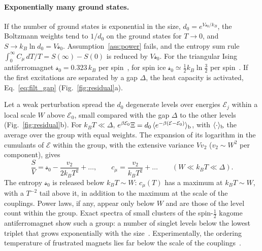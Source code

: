 \documentclass[10pt,a4paper]{article}
\theoremstyle{plain}
\newcommand{\enrg}{\mathcal{E}}  %
\newcommand{\lds}{\mathscr{s}}  %
\begin{document}
\paragraph{Exponentially many ground states.} If the number of ground
states is exponential in the size, $d_0=e^{V\lds_0/k_B}$, the Boltzmann
weights tend to $1/d_0$ on the ground states for $T\to0$, and
$S\to k_B\ln d_0=V\lds_0$. Assumption~\ref{ass:power} fails, and the entropy
sum rule $\int_0^\infty C_\mu\,dT/T=S(\infty)-S(0)$ is reduced by $V\lds_0$.
For the triangular Ising antiferromagnet $\lds_0=0.323\,k_B$ per
spin~\cite{Wannier1950}, for spin ice
$\lds_0\simeq\tfrac12k_B\ln\tfrac32$ per
spin~\cite{Pauling1935,Ramirez1999}. If the first excitations are separated
by a gap $\Delta$, the heat capacity is activated, Eq.~\eqref{eq:filt_gap}
(Fig.~\ref{fig:residual}a).

Let a weak perturbation spread the $d_0$ degenerate levels over energies
$\enrg_j$ within a local scale $W$ above $\enrg_0$, small compared with the
gap $\Delta$ to the other levels (Fig.~\ref{fig:residual}b). For
$k_BT\ll\Delta$,
$e^{\beta\enrg_0}\Xi=d_0\,\langle e^{-\beta(\enrg-\enrg_0)}\rangle_{\rm b}$, with
$\langle\cdot\rangle_{\rm b}$ the average over the group with equal weights.
The expansion of its logarithm in the cumulants of $\enrg$ within the group,
with the extensive variance $Vv_2$ ($v_2\sim W^{2}$ per component), gives
\[
  \frac{S}{V}=\lds_0-\frac{v_2}{2k_BT^{2}}+\dots ,\qquad
  c_\mu=\frac{v_2}{k_BT^{2}}+\dots \qquad (W\ll k_BT\ll\Delta) .
\]
The entropy $\lds_0$ is released below $k_BT\sim W$: $c_\mu(T)$ has a maximum
at $k_BT\sim W$, with a $T^{-2}$ tail above it, in addition to the maximum
at the scale of the couplings. Power laws, if any, appear only below $W$ and
are those of the level count within the group. Exact spectra of small
clusters of the spin-$\tfrac12$ kagome antiferromagnet show such a group: a
number of singlet levels below the lowest triplet that grows exponentially
with the size~\cite{Waldtmann1998}. Experimentally, the ordering temperature
of frustrated magnets lies far below the scale of the
couplings~\cite{Ramirez1994}.
\end{document}
